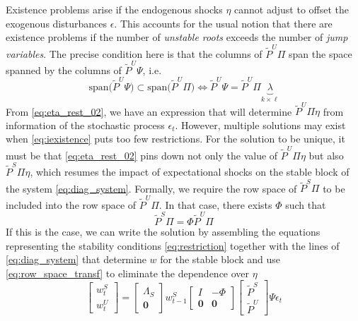 \documentclass[a4paper,10pt]{article}  %
\begin{document}
Existence problems arise if the endogenous shocks $ \eta $ cannot adjust to offset the exogenous disturbances $ \epsilon
$. This accounts for the usual notion that there are existence problems if the number of \emph{unstable roots} exceeds
the number of \emph{jump variables}. The precise condition here is that the columns of $ \tilde{P}^U \Pi $  span the
space spanned by the columns of $ \tilde{P}^U \Psi $, i.e.
\begin{equation}
   \label{eq:iexistence}
   \text{span} \Big( \tilde{P}^U \Psi \Big) \subset \text{span} \Big( \tilde{P}^U \Pi \Big) \Leftrightarrow
   \tilde{P}^U \Psi = \tilde{P}^U \Pi \underbrace{\lambda}_{ k \times \ell }
\end{equation}
From \eqref{eq:eta_rest_02}, we have an expression that will determine $ \tilde{P}^U \Pi \eta $ from information of the stochastic
process $ \epsilon_t $. However, multiple solutions may exist when \eqref{eq:iexistence} puts too few restrictions. For the solution to
be unique, it must be that \eqref{eq:eta_rest_02} pins down not only the value of $ \tilde{P}^U \Pi \eta $ but also $ \tilde{P}^S \Pi
\eta$, which resumes the impact of expectational shocks on the stable block of the system \eqref{eq:diag_system}. Formally, we require
the row space of $\tilde{P}^S \Pi  $ to be included into the row space of $ \tilde{P}^U \Pi $.
In that case, there exists $ \Phi $ such that
\begin{equation}
   \label{eq:row_space_transf}
   \tilde{P}^S \Pi = \Phi \tilde{P}^U \Pi
\end{equation}
If this is the case, we can write the solution by assembling the equations representing the stability conditions \eqref{eq:restriction}
together with the lines of \eqref{eq:diag_system} that determine $ w $ for the stable block and use \eqref{eq:row_space_transf} to
eliminate the dependence over $ \eta $
\begin{equation}
   \label{eq:system1_simul}
   \begin{bmatrix}
      w^S_{t} \\ w^U_{t}
   \end{bmatrix} = 
   \begin{bmatrix}
      \Lambda_S \\ \mathbf{0}
   \end{bmatrix} w^S_{t-1}
   \begin{bmatrix}
      I & -\Phi  \\ \mathbf{0} & \mathbf{0}
   \end{bmatrix}
   \begin{bmatrix}
      \tilde{P}^S \\ \tilde{P}^U
   \end{bmatrix}
   \Psi \epsilon_t
\end{equation}
\end{document}
